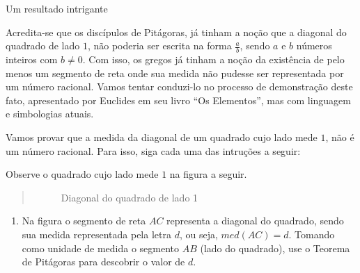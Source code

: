 \begin{task}{Um resultado intrigante}
\label{sub-ativ-irracional}



Acredita-se que os discípulos de Pitágoras, já tinham a noção que a diagonal do quadrado de lado $1$, não poderia ser escrita na forma $\frac{a}{b}$, sendo $a$ e $b$ números inteiros com $b \neq 0$. Com isso, os gregos já tinham a noção da existência de pelo menos um segmento de reta onde sua medida não pudesse ser representada por um número racional. Vamos tentar conduzi-lo no processo de demonstração deste fato, apresentado por Euclides em seu livro  “Os Elementos”, mas com linguagem e simbologias atuais.

Vamos provar que a medida da diagonal de um quadrado cujo lado mede $1$, não é um número racional. Para isso, siga cada uma das intruções a seguir:

Observe o quadrado cujo lado mede $1$ na figura a seguir.
\begin{quote}

\begin{figure}[H]
\centering
\capstart

\caption{Diagonal do quadrado de lado 1}\label{\detokenize{NO103-5:id8}}\label{\detokenize{NO103-5:id18}}\end{figure}
\end{quote}
\begin{enumerate}
\item {} 
Na figura o segmento de reta $AC$ representa a diagonal do quadrado, sendo sua medida representada pela letra $d$, ou seja, $med(AC)=d$. Tomando como unidade de medida o segmento $AB$ (lado do quadrado), use o Teorema de Pitágoras para descobrir o valor de $d$.


\end{enumerate}
\end{task}
